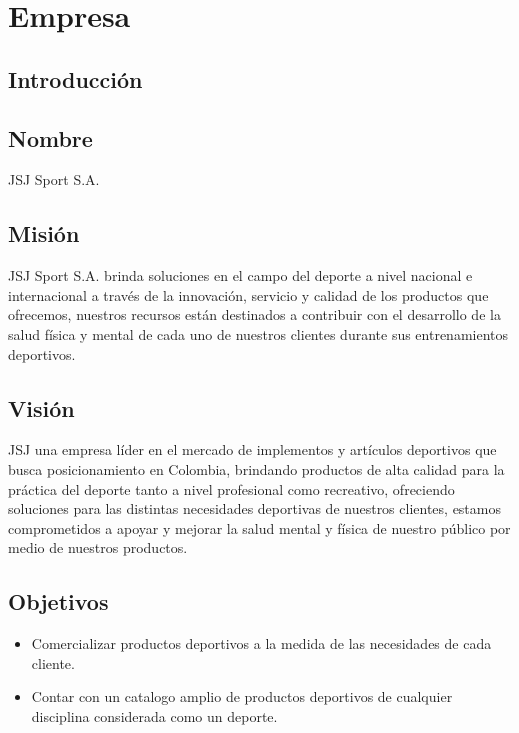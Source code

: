 \chapter{Empresa}

\section{Introducción}



\newpage

\section{Nombre}

JSJ Sport S.A.

\section{Misión}

JSJ Sport S.A. brinda soluciones en el campo del deporte a nivel nacional e internacional a través de la innovación, servicio y  calidad de los productos que ofrecemos, nuestros recursos están destinados a contribuir con el desarrollo de la salud física y mental de cada uno de nuestros clientes durante sus entrenamientos deportivos.

\section{Visión}

 JSJ una empresa líder en el mercado de implementos y artículos deportivos que busca posicionamiento en Colombia, brindando productos de alta calidad para la práctica del deporte tanto a nivel profesional como recreativo, ofreciendo soluciones para las distintas necesidades deportivas de nuestros clientes,  estamos comprometidos a apoyar y mejorar la salud mental y física de nuestro público por medio de nuestros productos.
\newpage

\section{Objetivos}

\begin{itemize}
	\item Comercializar productos deportivos a la medida  de las necesidades de cada cliente.
	\item Contar con un catalogo amplio de productos deportivos de cualquier disciplina considerada como un deporte.
\end{itemize}

\newpage


